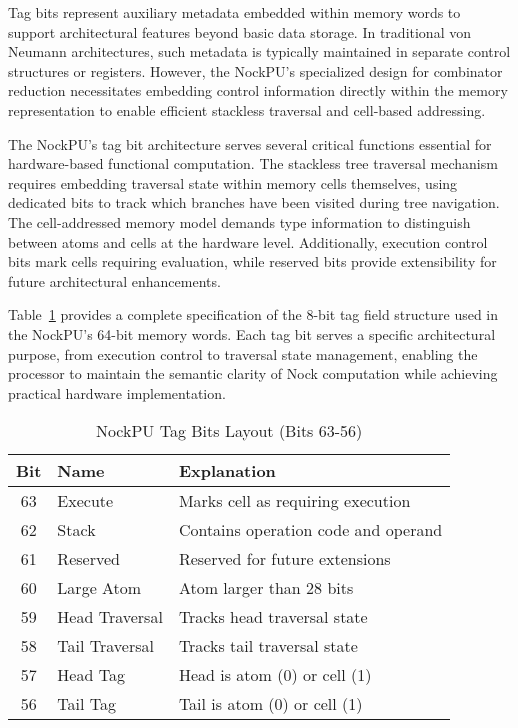 \documentclass[twoside]{article}
\begin{document}
Tag bits represent auxiliary metadata embedded within memory words to support architectural features beyond basic data storage. In traditional von Neumann architectures, such metadata is typically maintained in separate control structures or registers. However, the NockPU's specialized design for combinator reduction necessitates embedding control information directly within the memory representation to enable efficient stackless traversal and cell-based addressing.

The NockPU's tag bit architecture serves several critical functions essential for hardware-based functional computation. The stackless tree traversal mechanism requires embedding traversal state within memory cells themselves, using dedicated bits to track which branches have been visited during tree navigation. The cell-addressed memory model demands type information to distinguish between atoms and cells at the hardware level. Additionally, execution control bits mark cells requiring evaluation, while reserved bits provide extensibility for future architectural enhancements.

Table~\ref{tab:tag-bits} provides a complete specification of the 8-bit tag field structure used in the NockPU's 64-bit memory words. Each tag bit serves a specific architectural purpose, from execution control to traversal state management, enabling the processor to maintain the semantic clarity of Nock computation while achieving practical hardware implementation.

\begin{table}[h]
\centering
\caption{NockPU Tag Bits Layout (Bits 63-56)}
\label{tab:tag-bits}
\begin{tabular}{|c|l|p{6cm}|}
\hline
\textbf{Bit} & \textbf{Name} & \textbf{Explanation} \\
\hline
63 & Execute & Marks cell as requiring execution \\
62 & Stack & Contains operation code and operand \\
61 & Reserved & Reserved for future extensions \\
60 & Large Atom & Atom larger than 28 bits \\
59 & Head Traversal & Tracks head traversal state \\
58 & Tail Traversal & Tracks tail traversal state \\
57 & Head Tag & Head is atom (0) or cell (1) \\
56 & Tail Tag & Tail is atom (0) or cell (1) \\
\hline
\end{tabular}
\end{table}
\end{document}
